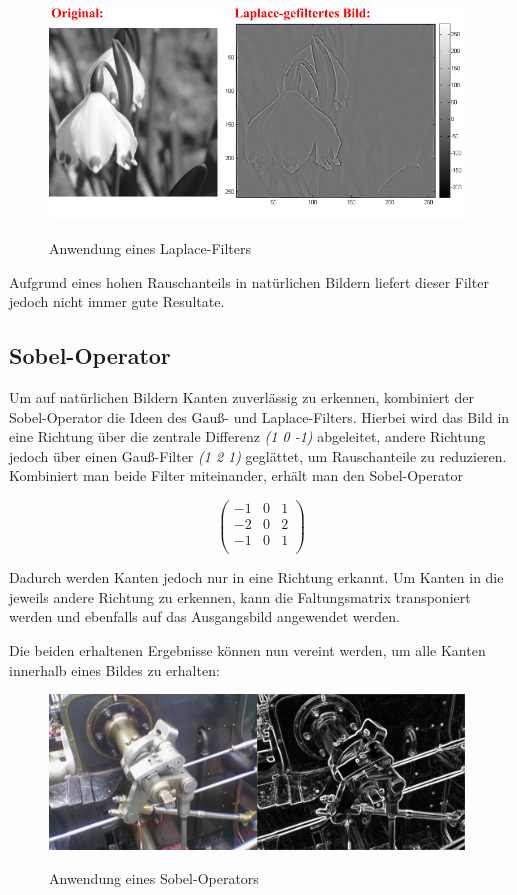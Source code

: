 \begin{figure}[ht]
   \centering
     \includegraphics[width=11cm]{Bilder/Laplace} \\
 \caption{Anwendung eines Laplace-Filters}
 \label{fig:Laplace}
\end{figure}

Aufgrund eines hohen Rauschanteils in natürlichen Bildern liefert dieser Filter jedoch nicht immer gute Resultate.

\subsection{Sobel-Operator}
\label{sec:Sobel}
Um auf natürlichen Bildern Kanten zuverlässig zu erkennen, kombiniert der Sobel-Operator die Ideen des Gauß- und Laplace-Filters.
Hierbei wird das Bild in eine Richtung über die zentrale Differenz {\em (1 0 -1)} abgeleitet, andere Richtung jedoch über einen Gauß-Filter {\em (1 2 1)} geglättet,
um Rauschanteile zu reduzieren.
Kombiniert man beide Filter miteinander, erhält man den Sobel-Operator

$$ \left( \begin{array}{rrr}
-1 & 0 & 1 \\
-2 & 0 & 2 \\
-1 & 0 & 1 \\
\end{array}\right) $$

Dadurch werden Kanten jedoch nur in eine Richtung erkannt.
Um Kanten in die jeweils andere Richtung zu erkennen, kann die Faltungsmatrix transponiert werden und ebenfalls auf
das Ausgangsbild angewendet werden.

Die beiden erhaltenen Ergebnisse können nun vereint werden, um alle Kanten innerhalb eines Bildes zu erhalten:

\begin{figure}[ht]
   \centering
     \includegraphics[width=11cm]{Bilder/Sobel} \\
 \caption{Anwendung eines Sobel-Operators}
 \label{fig:Sobel}
\end{figure}

